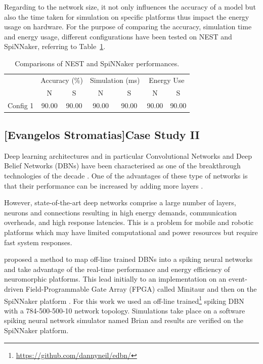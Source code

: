 Regarding to the network size, it not only influences the accuracy of a model but also the time taken for simulation on specific platforms thus impact the energy usage on hardware.
For the purpose of comparing the accuracy, simulation time and energy usage, different configurations have been tested on NEST and SpiNNaker, referring to Table~\ref{tbl:compare}.

\begin{table}[h]
\caption{Comparisons of NEST and SpiNNaker performances.}
\begin{center}
\begin{tabular} {c|c|c|c|c|c|c}
	 &\multicolumn{2}{c|}{Accuracy (\%)}  &\multicolumn{2}{c|}{Simulation (ms)}
	 &\multicolumn{2}{c}{Energy Use}   \\
	 \cline{2-7}
	& N & S & N & S & N & S\\
    \hline
    Config 1 & 90.00 & 90.00 & 90.00 & 90.00 & 90.00 & 90.00 \\

\end{tabular}
\label{tbl:compare}
\end{center}
\end{table}


\subsection{[Evangelos Stromatias]Case Study II}
Deep learning architectures and in particular Convolutional Networks \citep{lecun1998gradient} and Deep Belief Networks (DBNs) \citep{Hinton_etal_2006} have been characterised as one of the breakthrough technologies of the decade \citep{MIT_TechReview}. One of the advantages of these type of networks is that their performance can be increased by adding more layers \citep{Hinton_Contr_Divergence2006}.

However, state-of-the-art deep networks comprise a large number of layers, neurons and connections resulting in high energy demands, communication overheads, and high response latencies. This is a problem for mobile and robotic platforms which may have limited computational and power resources but require fast system responses. 


\citet{10.3389/fnins.2013.00178} proposed a method to map off-line trained DBNs into a spiking neural networks and take advantage of the real-time performance and energy efficiency of neuromorphic platforms. This lead initially to an implementation on an event-driven Field-Programmable Gate Array (FPGA) called Minitaur \citep{dannminitaur} and then on the SpiNNaker platform \citep{iscasSpinnakerAcceptedDemo,SpinnakerDBN2015}. For this work we used an off-line trained\footnote{\url{https://github.com/dannyneil/edbn/}} spiking DBN with a 784-500-500-10 network topology. Simulations take place on a software spiking neural network simulator named Brian \citep{briansim} and results are verified on the SpiNNaker platform.

